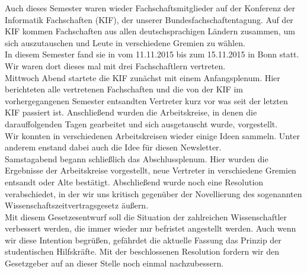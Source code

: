 Auch dieses Semester waren wieder Fachschaftsmitglieder auf der Konferenz der Informatik Fachschaften (KIF), der unserer Bundesfachschaftentagung. Auf der KIF kommen Fachschaften aus allen deutschsprachigen Ländern zusammen, um sich auszutauschen und Leute in verschiedene Gremien zu wählen.\\
In diesem Semester fand sie in vom 11.11.2015 bis zum 15.11.2015 in Bonn statt. Wir waren dort dieses mal mit drei Fachschaftlern vertreten.\\
Mittwoch Abend startete die KIF zunächst mit einem Anfangsplenum. Hier berichteten alle vertretenen Fachschaften und die von der KIF im vorhergegangenen Semester entsandten Vertreter kurz vor was seit der letzten KIF passiert ist. Anschließend wurden die Arbeitskreise, in denen die darauffolgenden Tagen gearbeitet und sich ausgetauscht wurde, vorgestellt.\\
Wir konnten in verschiedenen Arbeitskreisen wieder einige Ideen sammeln. Unter anderem enstand dabei auch die Idee für diesen Newsletter.\\
Samstagabend begann schließlich das Abschlussplenum. Hier wurden die Ergebnisse der Arbeitskreise vorgestellt, neue Vertreter in verschiedene Gremien entsandt oder Alte bestätigt. Abschließend wurde noch eine Resolution verabschiedet, in der wir uns kritisch gegenüber der Novellierung des sogenannten Wissenschaftszeitvertragsgesetz äußern.\\
Mit diesem Gesetzesentwurf soll die Situation der zahlreichen Wissenschaftler verbessert werden, die immer wieder nur befristet angestellt werden. Auch wenn wir diese Intention begrüßen, gefährdet die aktuelle Fassung das Prinzip der studentischen Hilfskräfte. Mit der beschlossenen Resolution fordern wir den Gesetzgeber auf an dieser Stelle noch einmal nachzubessern.


